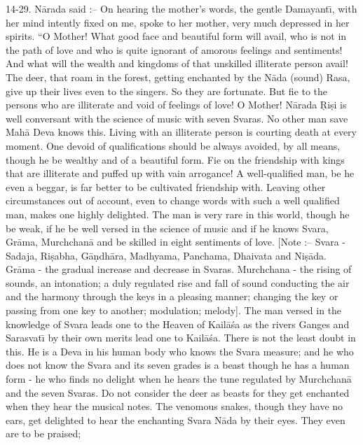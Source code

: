 14-29. N\=arada said :-- On hearing the mother's words, the gentle Damayant\={\i}, with her mind intently fixed on me, spoke to her mother, very much depressed in her spirits. ``O Mother! What good face and beautiful form will avail, who is not in the path of love and who is quite ignorant of amorous feelings and sentiments! And what will the wealth and kingdoms of that unskilled illiterate person avail! The deer, that roam in the forest, getting enchanted by the N\=ada (sound) Rasa, give up their lives even to the singers. So they are fortunate. But fie to the persons who are illiterate and void of feelings of love! O Mother! N\=arada \d{R}i\d{s}i is well conversant with the science of music with seven Svaras. No other man save Mah\=a Deva knows this. Living with an illiterate person is courting death at every moment. One devoid of qualifications should be always avoided, by all means, though he be wealthy and of a beautiful form. Fie on the friendship with kings that are illiterate and puffed up with vain arrogance! A well-qualified man, be he even a beggar, is far better to be cultivated friendship with. Leaving other circumstances out of account, even to change words with such a well qualified man, makes one highly delighted. The man is very rare in this world, though he be weak, if he be well versed in the science of music and if he knows Svara, Gr\=ama, Murchchan\=a and be skilled in eight sentiments of love. [Note :-- Svara - Sadaja, Ri\d{s}abha, G\=a\d{n}dh\=ara, Madhyama, Panchama, Dhaivata and Ni\d{s}\=ada. Gr\=ama - the gradual increase and decrease in Svaras. Murchchana - the rising of sounds, an intonation; a duly regulated rise and fall of sound conducting the air and the harmony through the keys in a pleasing manner; changing the key or passing from one key to another; modulation; melody]. The man versed in the knowledge of Svara leads one to the Heaven of Kail\=a\'sa as the rivers Ganges and Sarasvat\={\i} by their own merits lead one to Kail\=a\'sa. There is not the least doubt in this. He is a Deva in his human body who knows the Svara measure; and he who does not know the Svara and its seven grades is a beast though he has a human form - he who finds no delight when he hears the tune regulated by Murchchan\=a and the seven Svaras. Do not consider the deer as beasts for they get enchanted when they hear the musical notes. The venomous snakes, though they have no ears, get delighted to hear the enchanting Svara N\=ada by their eyes. They even are to be praised;

